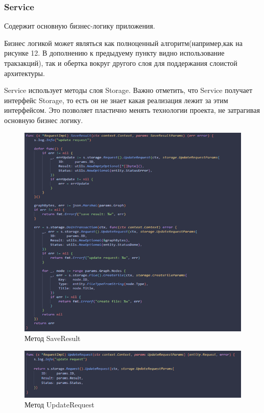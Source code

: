 \begin{itemize}
\subsubsection{Service}

Содержит основную бизнес-логику приложения.

Бизнес логикой может являться как полноценный алгоритм(например,как на рисунке 12. В дополнению к предыдуему пункту видно использование тракзакций), так и обертка вокруг другого слоя для поддержания слоистой архитектуры.

Service использует методы слоя Storage. Важно отметить, что Service получает интерфейс Storage, то есть он не знает какая реализация лежит за этим интерфейсом. Это позволяет пластично менять технологии проекта, не затрагивая основную бизнес логику.



\begin{figure}[H]
    \centering
    \includegraphics[width=1\textwidth]{styles/diploma/inc/service1.png} 
    \caption{Метод SaveResult}
    \label{fig:example}
\end{figure}

\begin{figure}[H]
    \centering
    \includegraphics[width=1\textwidth]{styles/diploma/inc/service2.png} 
    \caption{Метод UpdateRequest}
    \label{fig:example}
\end{figure}


\end{itemize}
